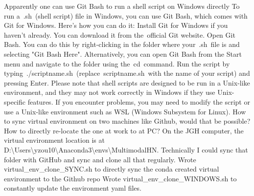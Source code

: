 \documentclass{article}%
\begin{document}
%
Apparently one can use Git Bash to run a shell script on Windows directly%
\newline%
\newline%
%
To run a~.sh~(shell script) file in Windows, you can use Git Bash, which comes with Git for Windows. Here's how you can do it:%
\newline%
\newline%
%
Install Git for Windows if you haven't already. You can download it from the~official Git website.%
\newline%
\newline%
%
Open Git Bash. You can do this by right{-}clicking in the folder where your~.sh~file is and selecting "Git Bash Here". Alternatively, you can open Git Bash from the Start menu and navigate to the folder using the~cd~command.%
\newline%
\newline%
%
Run the script by typing~./scriptname.sh~(replace~scriptname.sh~with the name of your script) and pressing Enter.%
\newline%
\newline%
%
Please note that shell scripts are designed to be run in a Unix{-}like environment, and they may not work correctly in Windows if they use Unix{-}specific features. If you encounter problems, you may need to modify the script or use a Unix{-}like environment such as WSL (Windows Subsystem for Linux).%
\newline%
\newline%
%
%
\newline%
\newline%
%
How to sync virtual environment on two machines like Github, would that be possible? How to directly re{-}locate the one at work to at PC?%
\newline%
\newline%
%
On the JGH computer, the virtual environment location is at D:\textbackslash{}Users\textbackslash{}yzou10\textbackslash{}Anaconda3\textbackslash{}envs\textbackslash{}MultimodalHN. Technically I could sync that folder with GitHub and sync and clone all that regularly. %
\newline%
\newline%
%
Wrote virtual\_env\_clone\_SYNC.sh to directly sync the conda created virtual environment to the Github repo%
\newline%
\newline%
%
Wrote virtual\_env\_clone\_WINDOWS.sh to constantly update the environment yaml files. %
\newline%
\end{document}
